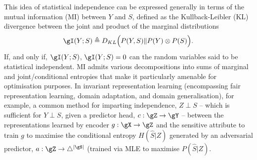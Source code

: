 This idea of statistical independence can be expressed generally in terms of the mutual information
(MI) between \(Y\) and \(S\), defined as the Kullback-Leibler (KL) divergence between the joint and
product of the marginal distributions
%
\begin{equation}
    \gI(Y;S) \triangleq D_{KL} \Bigl( P(Y, S) \Vert P(Y) \otimes P(S) \Bigr).
\end{equation}
%
If, and only if, \( \gI(Y;S)\), \( \gI(Y;S) = 0  \) can the random variables said to be
statistical independent.
%
MI admits various decompositions into sums of marginal and joint/conditional entropies that make it
particularly amenable for optimisation purposes. 
%
In invariant representation learning (encompassing fair representation learning, domain adaptation,
and domain generalisation), for example, a common method for imparting independence, \(Z \perp S \)
-- which is sufficient for \(Y \perp S\), given a predictor head, \(c: \gZ \to \gY \) -- between
the representations learned by encoder \(g: \gX \to \gZ \) and the sensitive attribute to train
\(g\) to maximise the conditional entropy \( H(\hat{S}|Z) \) generated by an adversarial predictor,
\(a: \gZ \to \bigtriangleup^{|\gS|}\) (trained via MLE to maximise \( P(\hat{S}|Z) \).


